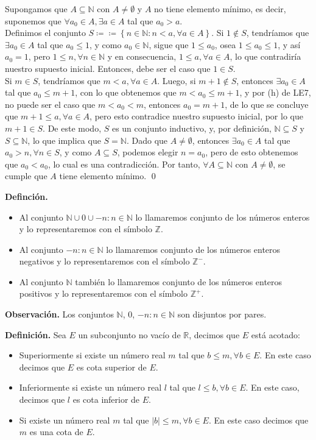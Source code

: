 \documentclass[11pt]{article}
\newcommand{\N}{\mathbb{N}}
\newcommand{\Z}{\mathbb{Z}}
\newcommand{\R}{\mathbb{R}}
\def\defined #1{\coloneqq \left\{#1\right\}}
\begin{document}
Supongamos que $A\subseteq \N$ con $A\neq \emptyset$ y $A$ no tiene elemento mínimo, es decir, suponemos que $\forall a_0\in A, \exists a\in A$ tal que $a_0>a$.\\[5pt]Definimos el conjunto $S \coloneqq \defined{n\in \N: n<a, \forall a \in A}$. Si $1\notin S$, tendríamos que $\exists a_0\in A$ tal que $a_0\leq 1$, y como $a_0\in \N$, sigue que $1 \leq a_0$, osea $1\leq a_0\leq 1$, y así $a_0 = 1$, pero $1\leq n, \forall n\in \N$ y en consecuencia, $1\leq a, \forall a\in A$, lo que contradiría nuestro supuesto inicial. Entonces, debe ser el caso que $1\in S$.\\[5pt] Si $m\in S$, tendríamos que $m<a, \forall a\in A$. Luego, si $m+1\notin S$, entonces $\exists a_0\in A$ tal que $a_0 \leq m+1$, con lo que obtenemos que $m<a_0 \leq m+1$, y por (h) de LE7, no puede ser el caso que $m<a_0<m$, entonces $a_0=m+1$, de lo que se concluye que $m+1\leq a , \forall a \in A$, pero esto contradice nuestro supuesto inicial, por lo que $m+1\in S$. De este modo, $S$ es un conjunto inductivo, y, por definición, $\N\subseteq S$ y  $S\subseteq \N$, lo que implica que $S=\N$. Dado que $A\neq \emptyset$, entonces $\exists a_0\in A$ tal que $a_0 >n, \forall n\in S$, y como $A\subseteq S$, podemos elegir $n=a_0$, pero de esto obtenemos que $a_0<a_0$, lo cual es una contradicción. Por tanto, $\forall A\subseteq \N$ con $A\neq \emptyset$, se cumple que $A$ tiene elemento mínimo. \qed

\textbf{Definción.} \begin{itemize}
    \item Al conjunto $\N \cup {0} \cup {-n: n\in \N}$ lo llamaremos conjunto de los números enteros y lo representaremos con el símbolo $\Z$.
    \item Al conjunto ${-n: n\in \N}$ lo llamaremos conjunto de los números enteros negativos y lo representaremos con el símbolo $\Z^-$.
    \item Al conjunto $\N$ también lo llamaremos conjunto de los números enteros positivos y lo representaremos con el símbolo $\Z^+$.
\end{itemize}

\textbf{Observación.} Los conjuntos $\N$, ${0}$, ${-n: n\in \N}$ son disjuntos por pares.

\textbf{Definición.} Sea $E$ un subconjunto no vacío de $\R$, decimos que $E$ está acotado: \begin{itemize}
    \item Superiormente si existe un número real $m$ tal que $b \leq m, \forall b\in E$. En este caso decimos que $E$ es cota superior de $E$.
    \item Inferiormente si existe un número real $l$ tal que $l \leq b, \forall b\in E$. En este caso, decimos que $l$ es cota inferior de $E$.
    \item Si existe un número real $m$ tal que $|b|\leq m,\forall b \in E$. En este caso decimos que $m$ es una cota de $E$.
\end{itemize}
\end{document}
